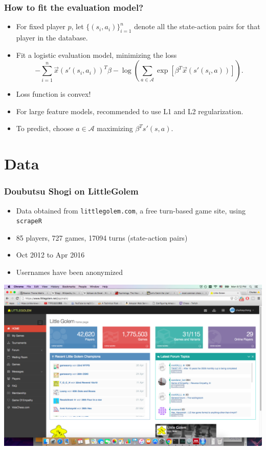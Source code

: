 \documentclass{beamer}
\begin{document}
\begin{frame}
\frametitle{How to fit the evaluation model?}
\begin{itemize}
\item For fixed player $p$, let $\{(s_i, a_i)\}_{i=1}^n$ denote all the state-action pairs for that player in the database.
\item Fit a logistic evaluation model, minimizing the loss
\[
-\sum_{i=1}^n \vec{x}(s'(s_i, a_i))^T \beta - \log(\sum_{a \in \mathcal{A}} \exp[\beta^T \vec{x}(s'(s_i, a))]).
\]
\item Loss function is convex!
\item For large feature models, recommended to use L1 and L2 regularization.
\item To predict, choose $a \in \mathcal{A}$ maximizing $\beta^T s'(s, a)$.
\end{itemize}
\end{frame}

\section{Data}

\begin{frame}
\sectionpage
\end{frame}

\begin{frame}
\frametitle{Doubutsu Shogi on LittleGolem}
\begin{itemize}
\item Data obtained from {\tt littlegolem.com}, a free turn-based game site, using {\tt scrapeR}
\item 85 players, 727 games, 17094 turns (state-action pairs)
\item Oct 2012 to Apr 2016
\item Usernames have been anonymized
\end{itemize}
\begin{center}
\includegraphics[scale = 0.1]{lg.png}
\end{center}
\end{frame}
\end{document}
